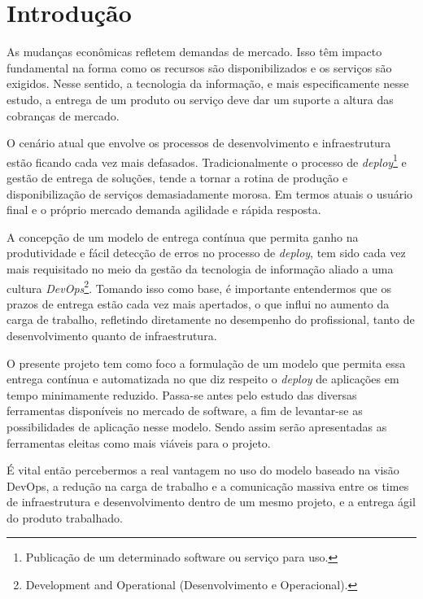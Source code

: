 

\chapter{Introdução}\label{intro}

As mudanças econômicas refletem demandas de mercado. Isso têm impacto fundamental na forma como os recursos são disponibilizados e os serviços são exigidos. Nesse sentido, a tecnologia da informação, e mais especificamente nesse estudo, a entrega de um produto ou serviço deve dar um suporte a altura das cobranças de mercado.

O cenário atual que envolve os processos de desenvolvimento e infraestrutura estão ficando cada vez mais defasados. Tradicionalmente o processo de \textit{deploy}\footnote{Publicação de um determinado software ou serviço para uso.} e gestão de entrega de soluções, tende a tornar a rotina de produção e disponibilização de serviços demasiadamente morosa. Em termos atuais o usuário final e o próprio mercado demanda agilidade e rápida resposta.

A concepção de um modelo de entrega contínua que permita ganho na produtividade e fácil detecção de erros no processo de \textit{deploy}, tem sido cada vez mais requisitado no meio da gestão da tecnologia de informação aliado a uma cultura \textit{DevOps}\footnote{Development and Operational (Desenvolvimento e Operacional).}. Tomando isso como base, é importante entendermos que os prazos de entrega estão cada vez mais apertados, o que influi no aumento da carga de trabalho, refletindo diretamente no desempenho do profissional, tanto de desenvolvimento quanto de infraestrutura.

O presente projeto tem como foco a formulação de um modelo que permita essa entrega contínua e automatizada no que diz respeito o \textit{deploy} de aplicações em tempo minimamente reduzido. Passa-se antes pelo estudo das diversas ferramentas disponíveis no mercado de software, a fim de levantar-se as possibilidades de aplicação nesse modelo. Sendo assim serão apresentadas as ferramentas eleitas como mais viáveis para o projeto.

É vital então percebermos a real vantagem no uso do modelo baseado na visão DevOps, a redução na carga de trabalho e a comunicação massiva entre os times de infraestrutura e desenvolvimento dentro de um mesmo projeto, e a entrega ágil do produto trabalhado.


